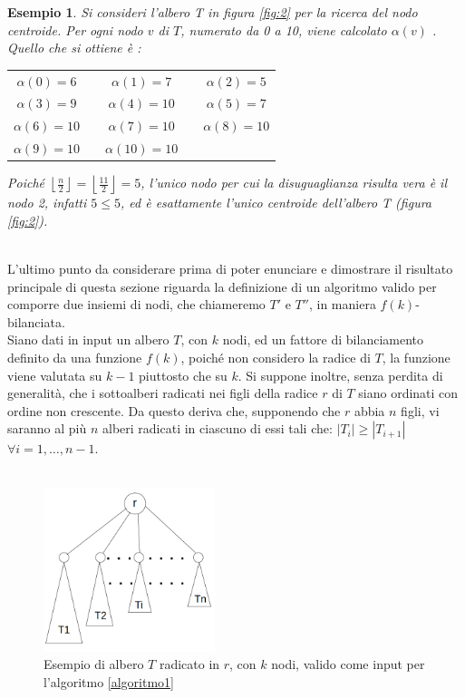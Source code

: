 \newtheorem{esempio}[definizione]{Esempio}
\begin{esempio}
	\label{es1}
Si consideri l'albero T in figura \ref{fig:2} per la ricerca del nodo centroide.
Per ogni nodo $ v $ di $ T $, numerato da 0 a 10,  viene calcolato $\alpha(v)$ . \\
Quello che si ottiene \`e :


\begin{center}
	\begin{tabular}{ c c c c c  }
		$\alpha(0) = 6$ & & $\alpha(1) = 7$ & & $\alpha(2) = 5$ \\ 
		$\alpha(3) = 9$ && $\alpha(4) = 10$ &&  $\alpha(5) =  7$ \\  
		$\alpha(6) = 10$ && $\alpha(7) = 10$ && $\alpha(8) = 10$ \\
		$\alpha(9) = 10$ && $\alpha(10) = 10$ &&
	\end{tabular}
\end{center}

Poich\'e $ \left\lfloor\frac{n}{2} \right\rfloor = \left\lfloor \frac{11}{2} \right\rfloor = 5$, l'unico nodo per cui la disuguaglianza risulta vera \`e il nodo 2, infatti $5\le 5$, ed \`e esattamente l'unico centroide dell'albero T (figura \ref{fig:2}). 
\demo
\end{esempio}\mbox{}\\

L'ultimo punto da considerare prima di poter enunciare e dimostrare il risultato principale di questa sezione riguarda la definizione di un algoritmo valido per comporre due insiemi di nodi, che chiameremo $ T' $ e $ T'' $, in maniera $ f(k) $-bilanciata.\\
Siano dati in input un albero $ T $, con $ k $ nodi, ed un fattore di bilanciamento definito da una funzione $ f(k) $, poich\'e non considero la radice di $ T $, la funzione viene valutata su $ k-1 $ piuttosto che su $ k $.
Si suppone inoltre, senza perdita di generalit\`a, che i sottoalberi radicati nei figli della radice $ r $ di $ T $ siano ordinati con ordine non crescente.
Da questo deriva che, supponendo che $ r $ abbia $ n $ figli, vi saranno al pi\`u $  n $ alberi radicati in ciascuno di essi tali che: $ |T_i| \ge |T_{i+1}|$ \ $ \forall i = 1,\dots, n-1 $.\mbox{}\\\\

	\begin{figure}[htbp]
	\centering
	\includegraphics[width=5cm]{capitolo3/grafo3}
	\caption{Esempio di albero $ T $ radicato in $ r $, con $ k $ nodi, valido come input per l'algoritmo \ref{algoritmo1}} 
	\label{fig:3}
\end{figure}
\mbox{}\\

